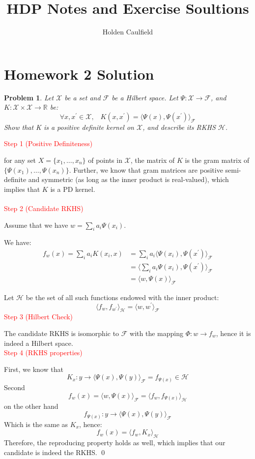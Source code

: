 \documentclass[12pt]{article}
\title{HDP Notes and Exercise Soultions}
\author{Holden Caulfield}
\newtheorem{ex}{Problem}
\begin{document}
	\centering	\section*{Homework 2 Solution}
	
	\begin{bx}
		
		\begin{ex}
		Let $\mathcal{X}$ be a set and $\mathcal{F}$ be a Hilbert space. Let $\Psi: \mathcal{X} \rightarrow \mathcal{F}$, and $K: \mathcal{X}\times\mathcal{X} \rightarrow \mathbb{R}$
		be:
		\[
		\forall x,x^\prime\in\mathcal{X},\;\;\; K(x,x^\prime)=\langle \Psi(x),\Psi(x^\prime)\rangle_{\mathcal{F}}
		\]
		Show that K is a positive definite kernel on $\mathcal{X}$, and describe its RKHS $\mathcal{H}$.
		\end{ex}
		\tcblower
		\textcolor{red}{Step 1 (Positive Definiteness)}
		
		 for any set $X=\{x_1,\dots,x_n\}$ of points in $\mathcal{X}$, the matrix of $K$ is the gram matrix of $\{\Psi(x_1),\dots,\Psi(x_n)\}$. Further, we know that gram matrices are positive semi-definite and symmetric (as long as the inner product is real-valued), which implies that $K$ is a PD kernel. \\ \\
		 	\textcolor{red}{Step 2 (Candidate RKHS)}
		 
		Assume that we have $w=\sum\limits_{i}a_i\Psi(x_i)$.
		
		We have:
		 \begin{align*}
		 f_w(x)=\sum\limits_{i}a_iK(x_i,x)&=\sum\limits_{i}a_i\langle \Psi(x_i),\Psi(x^\prime)\rangle_\mathcal{F} \\
		 &= \langle \sum\limits_{i}a_i\Psi(x_i),\Psi(x^\prime)\rangle_\mathcal{F} \\
		 &=\langle w,\Psi(x)\rangle_\mathcal{F}
		 \end{align*}
	 
	 Let $\mathcal{H}$ be the set of all such functions endowed with the inner product:
	 \[
	 \langle f_w,f_{w^\prime}\rangle_\mathcal{H}=\langle w,w^\prime \rangle_\mathcal{F}
	 \]
	 \textcolor{red}{Step 3 (Hilbert Check)}
	 
	 The candidate RKHS is isomorphic to $\mathcal{F}$ with the mapping $\Phi:w\rightarrow f_w$, hence it is indeed a Hilbert space. \\ 
	 \textcolor{red}{Step 4 (RKHS properties)}
	 
	 First, we know that 
	 \[
	 K_x:y\rightarrow\langle \Psi(x),\Psi(y)\rangle_\mathcal{F} = f_{\Psi(x)} \in \mathcal{H}
	 \]
	 Second
	 \[
	 f_w(x)=\langle w,\Psi(x)\rangle_\mathcal{F}=\langle f_w,f_{\Psi(x)}\rangle_\mathcal{H}
	 \]
	 on the other hand
	 \[
	 f_{\Psi(x)}:y\rightarrow\langle\Psi(x),\Psi(y)\rangle_\mathcal{F}
	 \]
	 Which is the same as $K_x$, hence:
	 \[
	 f_w(x)=\langle f_w,K_x\rangle_\mathcal{H}
	 \]
	 Therefore, the reproducing property holds as well, which implies that our candidate is indeed the RKHS.
	 \qed
	\end{bx}
\end{document}

